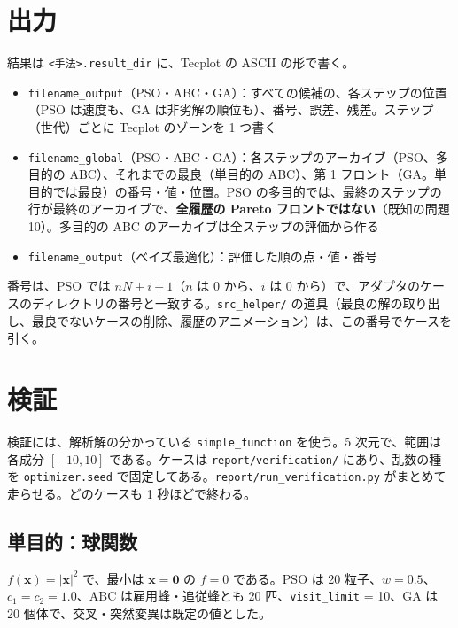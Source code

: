 \documentclass[11pt,a4paper,dvipdfmx]{jsarticle}
\begin{document}
\section{出力}\label{sec:output}

結果は \texttt{<手法>.result\_dir} に、Tecplot の ASCII の形で書く。

\begin{itemize}
\item \texttt{filename\_output}（PSO・ABC・GA）：すべての候補の、各ステップの位置（PSO は速度も、GA は非劣解の順位も）、番号、誤差、残差。ステップ（世代）ごとに Tecplot のゾーンを 1 つ書く
\item \texttt{filename\_global}（PSO・ABC・GA）：各ステップのアーカイブ（PSO、多目的の ABC）、それまでの最良（単目的の ABC）、第 1 フロント（GA。単目的では最良）の番号・値・位置。PSO の多目的では、最終のステップの行が最終のアーカイブで、\textbf{全履歴の Pareto フロントではない}（既知の問題 10）。多目的の ABC のアーカイブは全ステップの評価から作る
\item \texttt{filename\_output}（ベイズ最適化）：評価した順の点・値・番号
\end{itemize}

番号は、PSO では $n N + i + 1$（$n$ は 0 から、$i$ は 0 から）で、アダプタのケースのディレクトリの番号と一致する。\texttt{src\_helper/} の道具（最良の解の取り出し、最良でないケースの削除、履歴のアニメーション）は、この番号でケースを引く。

\section{検証}\label{sec:verification}

検証には、解析解の分かっている \texttt{simple\_function} を使う。5 次元で、範囲は各成分 $[-10, 10]$ である。ケースは \texttt{report/verification/} にあり、乱数の種を \texttt{optimizer.seed} で固定してある。\texttt{report/run\_verification.py} がまとめて走らせる。どのケースも 1 秒ほどで終わる。

\subsection{単目的：球関数}\label{sec:val-sphere}

$f(\mathbf{x}) = |\mathbf{x}|^2$ で、最小は $\mathbf{x} = \mathbf{0}$ の $f = 0$ である。PSO は 20 粒子、$w = 0.5$、$c_1 = c_2 = 1.0$、ABC は雇用蜂・追従蜂とも 20 匹、\texttt{visit\_limit} = 10、GA は 20 個体で、交叉・突然変異は既定の値とした。
\end{document}
